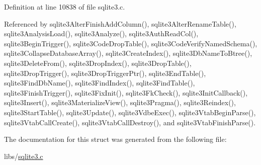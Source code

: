 Definition at line 10838 of file sqlite3.\+c.



Referenced by sqlite3\+Alter\+Finish\+Add\+Column(), sqlite3\+Alter\+Rename\+Table(), sqlite3\+Analysis\+Load(), sqlite3\+Analyze(), sqlite3\+Auth\+Read\+Col(), sqlite3\+Begin\+Trigger(), sqlite3\+Code\+Drop\+Table(), sqlite3\+Code\+Verify\+Named\+Schema(), sqlite3\+Collapse\+Database\+Array(), sqlite3\+Create\+Index(), sqlite3\+Db\+Name\+To\+Btree(), sqlite3\+Delete\+From(), sqlite3\+Drop\+Index(), sqlite3\+Drop\+Table(), sqlite3\+Drop\+Trigger(), sqlite3\+Drop\+Trigger\+Ptr(), sqlite3\+End\+Table(), sqlite3\+Find\+Db\+Name(), sqlite3\+Find\+Index(), sqlite3\+Find\+Table(), sqlite3\+Finish\+Trigger(), sqlite3\+Fix\+Init(), sqlite3\+Fk\+Check(), sqlite3\+Init\+Callback(), sqlite3\+Insert(), sqlite3\+Materialize\+View(), sqlite3\+Pragma(), sqlite3\+Reindex(), sqlite3\+Start\+Table(), sqlite3\+Update(), sqlite3\+Vdbe\+Exec(), sqlite3\+Vtab\+Begin\+Parse(), sqlite3\+Vtab\+Call\+Create(), sqlite3\+Vtab\+Call\+Destroy(), and sqlite3\+Vtab\+Finish\+Parse().



The documentation for this struct was generated from the following file\+:\begin{DoxyCompactItemize}
\item 
libs/\hyperlink{sqlite3_8c}{sqlite3.\+c}\end{DoxyCompactItemize}
